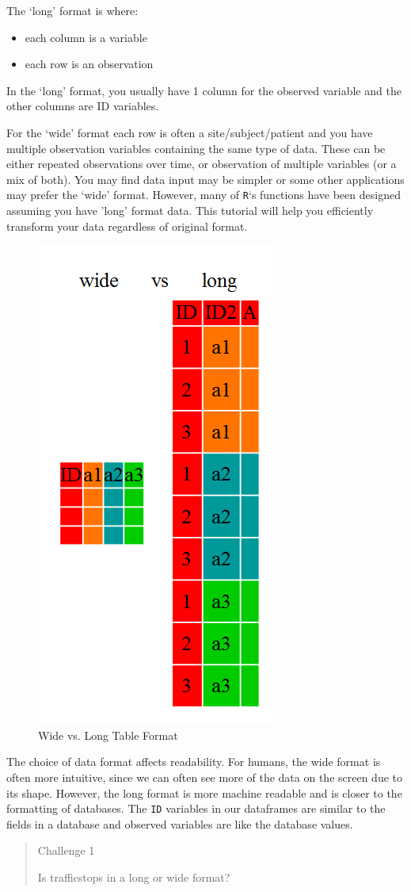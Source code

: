 \documentclass[]{book}
\providecommand{\tightlist}{%
  \setlength{\itemsep}{0pt}\setlength{\parskip}{0pt}}
\theoremstyle{definition}
\theoremstyle{definition}
\theoremstyle{definition}
\theoremstyle{remark}
\begin{document}
The `long' format is where:

\begin{itemize}
\tightlist
\item
  each column is a variable
\item
  each row is an observation
\end{itemize}

In the `long' format, you usually have 1 column for the observed
variable and the other columns are ID variables.

For the `wide' format each row is often a site/subject/patient and you
have multiple observation variables containing the same type of data.
These can be either repeated observations over time, or observation of
multiple variables (or a mix of both). You may find data input may be
simpler or some other applications may prefer the `wide' format.
However, many of \texttt{R}`s functions have been designed assuming you
have 'long' format data. This tutorial will help you efficiently
transform your data regardless of original format.

\begin{figure}
\includegraphics[width=0.3\linewidth]{img/wide-vs-long} \caption{Wide vs. Long Table Format}\label{fig:wide-vs-long}
\end{figure}

The choice of data format affects readability. For humans, the wide
format is often more intuitive, since we can often see more of the data
on the screen due to its shape. However, the long format is more machine
readable and is closer to the formatting of databases. The \texttt{ID}
variables in our dataframes are similar to the fields in a database and
observed variables are like the database values.

\begin{quote}
Challenge 1

Is trafficstops in a long or wide format?
\end{quote}
\end{document}
